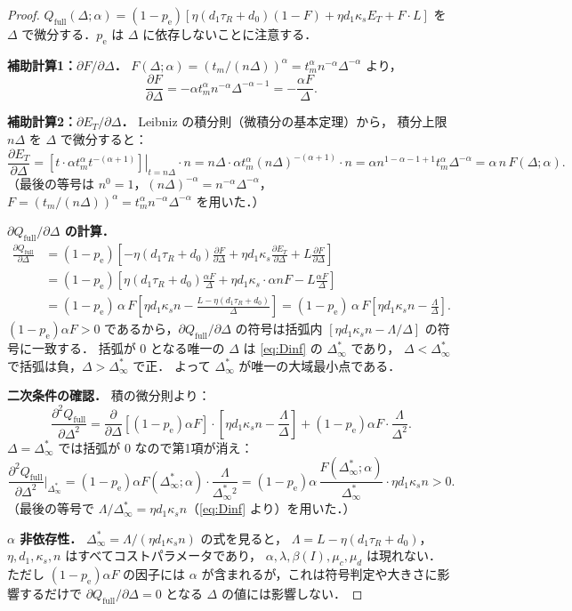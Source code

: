 \documentclass[12pt,a4paper]{article}
\theoremstyle{plain}
\theoremstyle{definition}
\theoremstyle{remark}
\newcommand{\pe}{p_{\mathrm{e}}}
\newcommand{\Qf}{Q_{\mathrm{full}}}
\newcommand{\betaI}{\beta(I)}
\newcommand{\Dinf}{\Delta^{*}_{\infty}}
\newcommand{\La}{\Lambda}
\begin{document}
\begin{proof}
$\Qf(\Delta;\alpha)=(1-\pe)[\eta(d_1\tau_R+d_0)(1-F)+\eta d_1\kappa_s E_T+F\cdot L]$
を $\Delta$ で微分する．$\pe$ は $\Delta$ に依存しないことに注意する．

\medskip
\noindent\textbf{補助計算1：$\partial F/\partial\Delta$．}
$F(\Delta;\alpha)=(t_m/(n\Delta))^\alpha=t_m^\alpha n^{-\alpha}\Delta^{-\alpha}$ より，
\[
\frac{\partial F}{\partial\Delta}
=-\alpha t_m^\alpha n^{-\alpha}\Delta^{-\alpha-1}
=-\frac{\alpha F}{\Delta}.
\]

\medskip
\noindent\textbf{補助計算2：$\partial E_T/\partial\Delta$．}
Leibniz の積分則（微積分の基本定理）から，
積分上限 $n\Delta$ を $\Delta$ で微分すると：
\[
\frac{\partial E_T}{\partial\Delta}
=\left.\left[t\cdot\alpha t_m^\alpha t^{-(\alpha+1)}\right]\right|_{t=n\Delta}\cdot n
=n\Delta\cdot\alpha t_m^\alpha(n\Delta)^{-(\alpha+1)}\cdot n
=\alpha n^{1-\alpha-1+1}t_m^\alpha\Delta^{-\alpha}
=\alpha\,n\,F(\Delta;\alpha).
\]
（最後の等号は $n^0=1$，$(n\Delta)^{-\alpha}=n^{-\alpha}\Delta^{-\alpha}$，
$F=(t_m/(n\Delta))^\alpha=t_m^\alpha n^{-\alpha}\Delta^{-\alpha}$ を用いた．）

\medskip
\noindent\textbf{$\partial\Qf/\partial\Delta$ の計算．}
\begin{align*}
\frac{\partial\Qf}{\partial\Delta}
&=(1-\pe)\!\left[
-\eta(d_1\tau_R+d_0)\frac{\partial F}{\partial\Delta}
+\eta d_1\kappa_s\frac{\partial E_T}{\partial\Delta}
+L\frac{\partial F}{\partial\Delta}
\right]\\
&=(1-\pe)\!\left[
\eta(d_1\tau_R+d_0)\frac{\alpha F}{\Delta}
+\eta d_1\kappa_s\cdot\alpha n F
-L\frac{\alpha F}{\Delta}
\right]\\
&=(1-\pe)\,\alpha\,F\!\left[
\eta d_1\kappa_s n
-\frac{L-\eta(d_1\tau_R+d_0)}{\Delta}
\right]
=(1-\pe)\,\alpha\,F\!\left[\eta d_1\kappa_s n-\frac{\La}{\Delta}\right].
\end{align*}
$(1-\pe)\alpha F>0$ であるから，$\partial\Qf/\partial\Delta$ の符号は括弧内
$[\eta d_1\kappa_s n-\La/\Delta]$ の符号に一致する．
括弧が 0 となる唯一の $\Delta$ は \eqref{eq:Dinf} の $\Dinf$ であり，
$\Delta<\Dinf$ で括弧は負，$\Delta>\Dinf$ で正．
よって $\Dinf$ が唯一の大域最小点である．

\medskip
\noindent\textbf{二次条件の確認．}
積の微分則より：
\[
\frac{\partial^2\Qf}{\partial\Delta^2}
=\frac{\partial}{\partial\Delta}\!\left[(1-\pe)\alpha F\right]\cdot\left[\eta d_1\kappa_s n-\frac{\La}{\Delta}\right]
+(1-\pe)\alpha F\cdot\frac{\La}{\Delta^2}.
\]
$\Delta=\Dinf$ では括弧が $0$ なので第1項が消え：
\[
\frac{\partial^2\Qf}{\partial\Delta^2}\bigg|_{\Dinf}
=(1-\pe)\alpha F(\Dinf;\alpha)\cdot\frac{\La}{\Dinf^2}
=(1-\pe)\alpha\,\frac{F(\Dinf;\alpha)}{\Dinf}\cdot\eta d_1\kappa_s n>0.
\]
（最後の等号で $\La/\Dinf=\eta d_1\kappa_s n$（\eqref{eq:Dinf} より）を用いた．）

\medskip
\noindent\textbf{$\alpha$ 非依存性．}
$\Dinf=\La/(\eta d_1\kappa_s n)$ の式を見ると，
$\La=L-\eta(d_1\tau_R+d_0)$，$\eta,d_1,\kappa_s,n$ はすべてコストパラメータであり，
$\alpha,\lambda,\betaI,\mu_c,\mu_d$ は現れない．
ただし $(1-\pe)\alpha F$ の因子には $\alpha$ が含まれるが，これは符号判定や大きさに影響するだけで
$\partial\Qf/\partial\Delta=0$ となる $\Delta$ の値には影響しない．
\end{proof}
\end{document}
